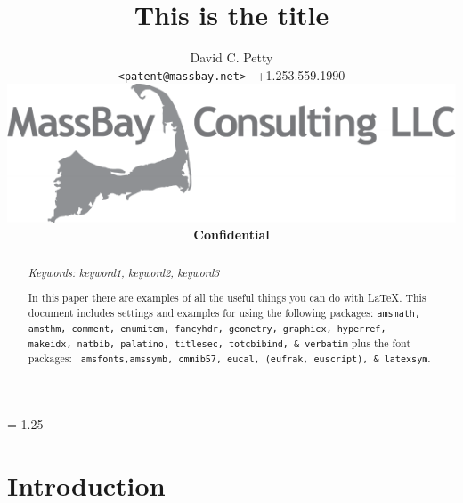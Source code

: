 \documentclass[11pt,twocolumn]{article}%
\makeatletter
\def\docauthor{David C. Petty}%
\def\doctitle{This is the title}%
\def\docemail{patent@massbay.net}%
\def\docphone{+1.253.559.1990}%
\numberwithin{equation}{section}%
\makeatother
\begin{document}
\title{{\bf \doctitle}}%

\author{\docauthor %
\\%
{\small \texttt{\textless\docemail\textgreater} \textbullet \ \docphone}\\%
\href{http://massbay.net/}
{\includegraphics*[scale=0.75]{../images/MassBayLogo1085x337.pdf}}\\%
{\bf\sc Confidential}}%

\date{ } %

\maketitle

\begin{abstract}


{\em Keywords: keyword1, keyword2, keyword3 %

In this paper there are examples of all the useful things you can do
with \LaTeX. This document includes settings and examples for using
the following packages: {\tt amsmath, amsthm, comment, enumitem,
fancyhdr, geometry, graphicx, hyperref, makeidx, natbib, palatino,
titlesec, totcbibind, \& verbatim} plus the font packages: {\tt
amsfonts,amssymb, cmmib57, eucal, (eufrak, euscript), \& latexsym}.
}

\end{abstract}


\baselineskip = 1.25\baselineskip %

\section{Introduction}
\label{Introduction}
\end{document}
